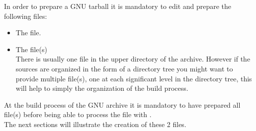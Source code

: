 \clearpage
\noindent In order to prepare a GNU tarball it is mandatory to edit and prepare the following files:
\begin{itemize}
\item The  file.
\item The  file(s) \\
There is usually one file in the upper directory of the archive. 
However if the sources are organized in the form of a directory tree you might want to provide multiple  file(s), 
one at each significant level in the directory tree, this will help to simply the organization of the build process. 
\end{itemize}
At the build process of the GNU archive it is mandatory to have prepared all  file(s) before being able to process the  file with . \\[0.25cm]
The next sections will illustrate the creation of these 2 files. 

